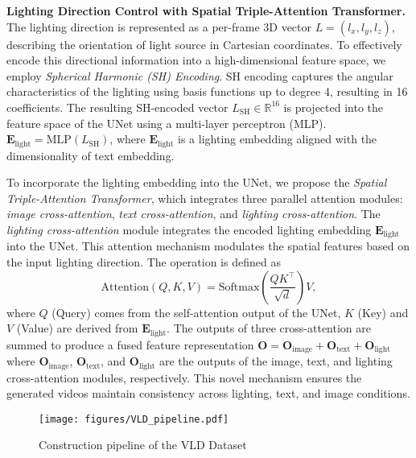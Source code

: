 \noindent \textbf{Lighting Direction Control with Spatial Triple-Attention Transformer.}
The lighting direction is represented as a per-frame 3D vector $L=(l_x, l_y, l_z)$, describing the orientation of light source in Cartesian coordinates. To effectively encode this directional information into a high-dimensional feature space, we employ \textit{Spherical Harmonic (SH) Encoding}. SH encoding captures the angular characteristics of the lighting using basis functions up to degree 4, resulting in 16 coefficients. The resulting SH-encoded vector $L_{\text{SH}} \in \mathbb{R}^{16}$ is projected into the feature space of the UNet using a multi-layer perceptron (MLP). $\mathbf{E}_{\text{light}} = \text{MLP}(L_{\text{SH}})$, where $\mathbf{E}_{\text{light}}$ is a lighting embedding aligned with the dimensionality of text embedding.

To incorporate the lighting embedding into the UNet, we propose the \textit{Spatial Triple-Attention Transformer}, which integrates three parallel attention modules: \textit{image cross-attention}, \textit{text cross-attention}, and \textit{lighting cross-attention}.
The \textit{lighting cross-attention} module integrates the encoded lighting embedding $\mathbf{E}_{\text{light}}$ into the UNet. This attention mechanism modulates the spatial features based on the input lighting direction. The operation is defined as 
\begin{equation}
    \text{Attention}(Q, K, V) = \text{Softmax}\left(\frac{Q K^\top}{\sqrt{d}}\right) V,
\end{equation}
where $Q$ (Query) comes from the self-attention output of the UNet, $K$ (Key) and $V$ (Value) are derived from $\mathbf{E}_{\text{light}}$.
The outputs of three cross-attention are summed to produce a fused feature representation $\mathbf{O} = \mathbf{O}_{\text{image}} + \mathbf{O}_{\text{text}} + \mathbf{O}_{\text{light}}$
where $\mathbf{O}_{\text{image}}$, $\mathbf{O}_{\text{text}}$, and $\mathbf{O}_{\text{light}}$ are the outputs of the image, text, and lighting cross-attention modules, respectively. 
This novel mechanism ensures the generated videos maintain consistency across lighting, text, and image conditions.

\begin{figure}
    \centering
    \texttt{[image: figures/VLD\_pipeline.pdf]}
    \caption{Construction pipeline of the VLD Dataset}
    \label{fig:VLD_pipeline}
    \vspace{-10pt}
\end{figure}





